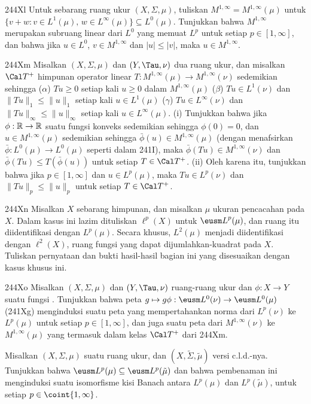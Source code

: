 {\spheader 244Xl Untuk sebarang ruang ukur $(X,\Sigma,\mu)$, tuliskan
$M^{1,\infty}=M^{1,\infty}(\mu)$ untuk
$\{v+w:v\in L^1(\mu),\,w\in L^{\infty}(\mu)\}\subseteq L^0(\mu)$.
Tunjukkan bahwa $M^{1,\infty}$ merupakan subruang linear dari $L^0$
yang memuat $L^p$ untuk setiap $p\in[1,\infty]$, dan bahwa jika
$u\in L^0$, $v\in M^{1,\infty}$ dan $|u|\le |v|$, maka
$u\in M^{1,\infty}$. 

\spheader 244Xm Misalkan $(X,\Sigma,\mu)$ dan $(Y,\Tau,\nu)$ dua ruang
ukur, dan misalkan $\Cal T^+$ himpunan operator linear
$T:M^{1,\infty}(\mu)\to M^{1,\infty}(\nu)$ sedemikian sehingga
($\alpha$) $Tu\ge 0$ setiap kali $u\ge 0$ dalam $M^{1,\infty}(\mu)$
($\beta$) $Tu\in L^1(\nu)$ dan $\|Tu\|_1\le\|u\|_1$ setiap kali
$u\in L^1(\mu)$ ($\gamma$) $Tu\in L^{\infty}(\nu)$ dan
$\|Tu\|_{\infty}\le\|u\|_{\infty}$ setiap kali
$u\in L^{\infty}(\mu)$. (i) Tunjukkan bahwa jika
$\phi:\Bbb R\to\Bbb R$ suatu fungsi konveks sedemikian sehingga
$\phi(0)=0$, dan $u\in M^{1,\infty}(\mu)$ sedemikian sehingga
$\bar\phi(u)\in M^{1,\infty}(\mu)$ (dengan menafsirkan
$\bar\phi:L^0(\mu)\to L^0(\mu)$ seperti dalam 241I), maka
$\bar\phi(Tu)\in M^{1,\infty}(\nu)$ dan
$\bar\phi(Tu)\le T(\bar\phi(u))$ untuk setiap $T\in\Cal T^+$.
(ii) Oleh karena itu, tunjukkan bahwa jika $p\in[1,\infty]$ dan
$u\in L^p(\mu)$, maka $Tu\in L^p(\nu)$ dan
$\|Tu\|_p\le\|u\|_p$ untuk setiap $T\in\Cal T^+$.

\sqheader 244Xn Misalkan $X$ sebarang himpunan, dan misalkan $\mu$ ukuran
pencacahan pada $X$. Dalam kasus ini lazim dituliskan $\ell^p(X)$ untuk
${\eusm L}^p(\mu)$, dan ruang itu diidentifikasi dengan $L^p(\mu)$.
Secara khusus, $L^2(\mu)$ menjadi diidentifikasi dengan $\ell^2(X)$,
ruang fungsi yang dapat dijumlahkan-kuadrat pada $X$. Tuliskan pernyataan
dan bukti hasil-hasil bagian ini yang disesuaikan dengan kasus khusus ini.

\spheader 244Xo Misalkan $(X,\Sigma,\mu)$ dan $(Y,\Tau,\nu)$ ruang-ruang
ukur dan $\phi:X\to Y$ suatu fungsi \imp. Tunjukkan bahwa peta
$g\mapsto g\phi:\eusm L^0(\nu)\to\eusm L^0(\mu)$ (241Xg) menginduksi
suatu peta yang mempertahankan norma dari $L^p(\nu)$ ke $L^p(\mu)$ untuk
setiap $p\in[1,\infty]$, dan juga suatu peta dari $M^{1,\infty}(\nu)$ ke
$M^{1,\infty}(\mu)$ yang termasuk dalam kelas $\Cal T^+$ dari 244Xm.

Misalkan $(X,\Sigma,\mu)$ suatu ruang ukur, dan
$(X,\tilde\Sigma,\tilde\mu)$ versi c.l.d.-nya. Tunjukkan bahwa
$\eusm L^p(\mu)\subseteq\eusm L^p(\tilde\mu)$ dan bahwa pembenaman ini
menginduksi suatu isomorfisme kisi Banach antara $L^p(\mu)$ dan
$L^p(\tilde\mu)$, untuk setiap $p\in\coint{1,\infty}$.

}

